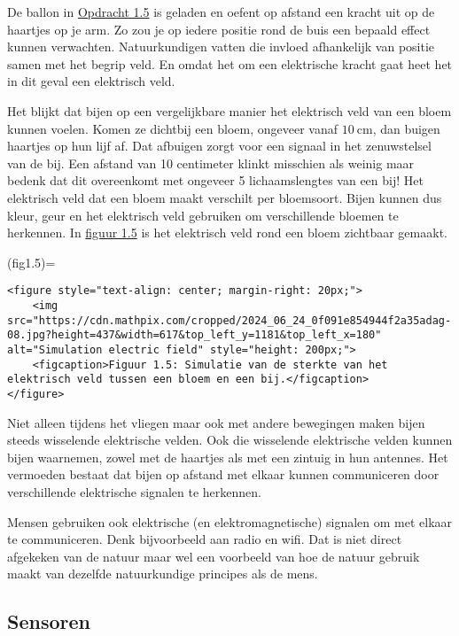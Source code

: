 De ballon in \href{ex1.5}{Opdracht 1.5} is geladen en oefent op afstand
een kracht uit op de haartjes op je arm. Zo zou je op iedere positie
rond de buis een bepaald effect kunnen verwachten. Natuurkundigen vatten
die invloed afhankelijk van positie samen met het begrip veld. En omdat
het om een elektrische kracht gaat heet het in dit geval een elektrisch
veld.

Het blijkt dat bijen op een vergelijkbare manier het elektrisch veld van
een bloem kunnen voelen. Komen ze dichtbij een bloem, ongeveer vanaf
\(10 \mathrm{~cm}\), dan buigen haartjes op hun lijf af. Dat afbuigen
zorgt voor een signaal in het zenuwstelsel van de bij. Een afstand van
10 centimeter klinkt misschien als weinig maar bedenk dat dit
overeenkomt met ongeveer 5 lichaamslengtes van een bij! Het elektrisch
veld dat een bloem maakt verschilt per bloemsoort. Bijen kunnen dus
kleur, geur en het elektrisch veld gebruiken om verschillende bloemen te
herkennen. In \href{fig1.5}{figuur 1.5} is het elektrisch veld rond een
bloem zichtbaar gemaakt.

(fig1.5)=

\begin{verbatim}
<figure style="text-align: center; margin-right: 20px;">
    <img src="https://cdn.mathpix.com/cropped/2024_06_24_0f091e854944f2a35adag-08.jpg?height=437&width=617&top_left_y=1181&top_left_x=180" alt="Simulation electric field" style="height: 200px;">
    <figcaption>Figuur 1.5: Simulatie van de sterkte van het elektrisch veld tussen een bloem en een bij.</figcaption>
</figure>
\end{verbatim}

Niet alleen tijdens het vliegen maar ook met andere bewegingen maken
bijen steeds wisselende elektrische velden. Ook die wisselende
elektrische velden kunnen bijen waarnemen, zowel met de haartjes als met
een zintuig in hun antennes. Het vermoeden bestaat dat bijen op afstand
met elkaar kunnen communiceren door verschillende elektrische signalen
te herkennen.

Mensen gebruiken ook elektrische (en elektromagnetische) signalen om met
elkaar te communiceren. Denk bijvoorbeeld aan radio en wifi. Dat is niet
direct afgekeken van de natuur maar wel een voorbeeld van hoe de natuur
gebruik maakt van dezelfde natuurkundige principes als de mens.

\hypertarget{sensoren}{%
\subsection{Sensoren}\label{sensoren}}

